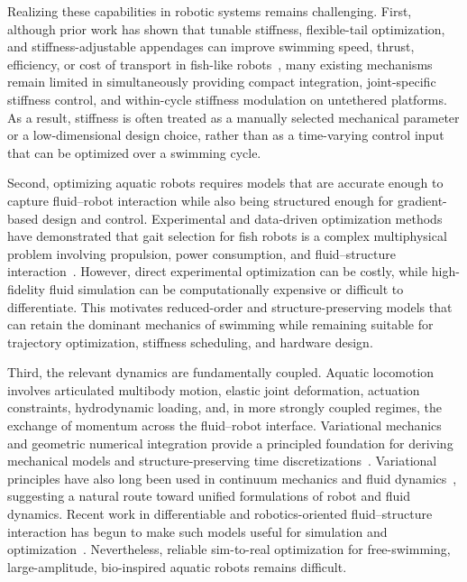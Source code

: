 Realizing these capabilities in robotic systems remains challenging. First, although prior work has shown that tunable stiffness, flexible-tail optimization, and stiffness-adjustable appendages can improve swimming speed, thrust, efficiency, or cost of transport in fish-like robots~\cite{jusufi_undulatory_2017,wolf_fish-like_2020,zhong_tunable_2021,quinn2022tunable,li2018soft,lu_development_2022,liu_tunable_2023,HVS_2023,kwak_development_2023,liao_fast_2024,obayashi_online_2025}, many existing mechanisms remain limited in simultaneously providing compact integration, joint-specific stiffness control, and within-cycle stiffness modulation on untethered platforms. As a result, stiffness is often treated as a manually selected mechanical parameter or a low-dimensional design choice, rather than as a time-varying control input that can be optimized over a swimming cycle.

Second, optimizing aquatic robots requires models that are accurate enough to capture fluid--robot interaction while also being structured enough for gradient-based design and control. Experimental and data-driven optimization methods have demonstrated that gait selection for fish robots is a complex multiphysical problem involving propulsion, power consumption, and fluid--structure interaction~\cite{abbaszadehExperimentalOptimizationFish2024,sharifzadehManeuverableGaitSelection2021,hu_design_2024}. However, direct experimental optimization can be costly, while high-fidelity fluid simulation can be computationally expensive or difficult to differentiate. This motivates reduced-order and structure-preserving models that can retain the dominant mechanics of swimming while remaining suitable for trajectory optimization, stiffness scheduling, and hardware design.

Third, the relevant dynamics are fundamentally coupled. Aquatic locomotion involves articulated multibody motion, elastic joint deformation, actuation constraints, hydrodynamic loading, and, in more strongly coupled regimes, the exchange of momentum across the fluid--robot interface. Variational mechanics and geometric numerical integration provide a principled foundation for deriving mechanical models and structure-preserving time discretizations~\cite{marsden2001discrete,hairer2006geometric}. Variational principles have also long been used in continuum mechanics and fluid dynamics~\cite{seligerVariationalPrinciplesContinuum1968a}, suggesting a natural route toward unified formulations of robot and fluid dynamics. Recent work in differentiable and robotics-oriented fluid--structure interaction has begun to make such models useful for simulation and optimization~\cite{lee2023aquarium,angelidisSmoothedParticleHydrodynamics2025,lee2026realizingroboticswimmingunified}. Nevertheless, reliable sim-to-real optimization for free-swimming, large-amplitude, bio-inspired aquatic robots remains difficult.

